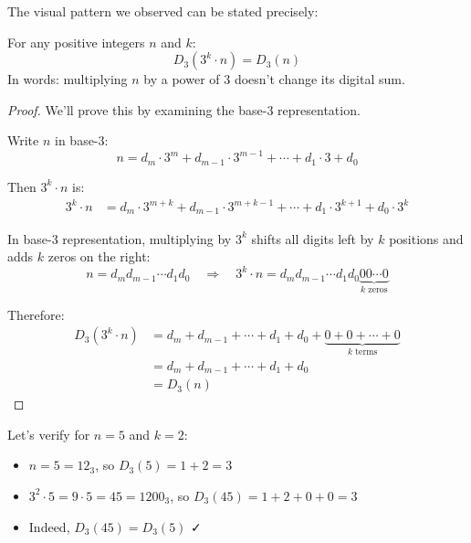 The visual pattern we observed can be stated precisely:

\begin{theorem}
\label{thm:d3-scaling}
For any positive integers $n$ and $k$:
\begin{equation}
D_3(3^k \cdot n) = D_3(n)
\end{equation}
In words: multiplying $n$ by a power of 3 doesn't change its digital sum.
\end{theorem}

\begin{proof}
We'll prove this by examining the base-3 representation.

Write $n$ in base-3:
\begin{equation}
n = d_m \cdot 3^m + d_{m-1} \cdot 3^{m-1} + \cdots + d_1 \cdot 3 + d_0
\end{equation}

Then $3^k \cdot n$ is:
\begin{align}
3^k \cdot n &= d_m \cdot 3^{m+k} + d_{m-1} \cdot 3^{m+k-1} + \cdots + d_1 \cdot 3^{k+1} + d_0 \cdot 3^k
\end{align}

In base-3 representation, multiplying by $3^k$ shifts all digits left by $k$ positions and adds $k$ zeros on the right:
\begin{equation}
n = d_m d_{m-1} \cdots d_1 d_0 \quad \Rightarrow \quad 3^k \cdot n = d_m d_{m-1} \cdots d_1 d_0 \underbrace{00\cdots0}_{k \text{ zeros}}
\end{equation}

Therefore:
\begin{align}
D_3(3^k \cdot n) &= d_m + d_{m-1} + \cdots + d_1 + d_0 + \underbrace{0 + 0 + \cdots + 0}_{k \text{ terms}} \\
&= d_m + d_{m-1} + \cdots + d_1 + d_0 \\
&= D_3(n)
\end{align}
\end{proof}

\begin{example}
Let's verify for $n = 5$ and $k = 2$:

\begin{itemize}
\item $n = 5 = 12_3$, so $D_3(5) = 1 + 2 = 3$
\item $3^2 \cdot 5 = 9 \cdot 5 = 45 = 1200_3$, so $D_3(45) = 1 + 2 + 0 + 0 = 3$
\item Indeed, $D_3(45) = D_3(5)$ ✓
\end{itemize}
\end{example}

